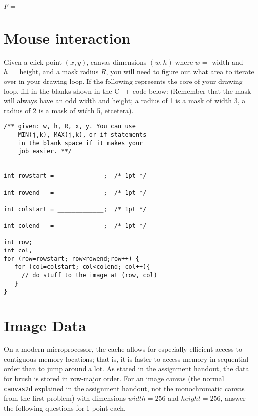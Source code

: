 \documentclass[10pt,twocolumn]{article}
\begin{document}
\begin{framed}
[2 points]\\

$F =$
\end{framed}

\section{Mouse interaction}
Given a click point $(x, y)$, canvas dimensions $(w, h)$ where $w =$ width and $h =$ height, and a
mask radius $R$, you will need to figure out what area to iterate over in your drawing loop. If
the following represents the core of your drawing loop, fill in the blanks shown in the C++
code below: (Remember that the mask will always have an odd width and height; a radius of
1 is a mask of width 3, a radius of 2 is a mask of width 5, etcetera).

\begin{framed}
\begin{verbatim}
/** given: w, h, R, x, y. You can use 
    MIN(j,k), MAX(j,k), or if statements 
    in the blank space if it makes your 
    job easier. **/
    

int rowstart = _____________;  /* 1pt */

int rowend   = _____________;  /* 1pt */

int colstart = _____________;  /* 1pt */

int colend   = _____________;  /* 1pt */

int row;
int col;
for (row=rowstart; row<rowend;row++) {
   for (col=colstart; col<colend; col++){
     // do stuff to the image at (row, col)
   } 
}
\end{verbatim}
\end{framed}

\section{Image Data}
On a modern microprocessor, the cache allows for especially efficient access to contiguous
memory locations; that is, it is faster to access memory in sequential order than to jump
around a lot. As stated in the assignment handout, the data for brush is stored in row-major
order. For an image canvas (the normal {\tt canvas2d} explained in the assignment handout, not
the monochromatic canvas from the first problem) with dimensions $width = 256$ and
$height = 256$, answer the following questions for 1 point each.
\end{document}
